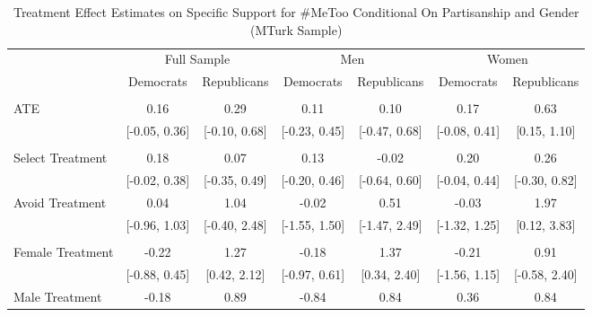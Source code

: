 \documentclass[
]{article}
\begin{document}
\begin{table}[H]

\caption{\label{tab:tabF3}Treatment Effect Estimates on Specific Support for \#MeToo Conditional On Partisanship and Gender (MTurk Sample)}
\centering
\begin{threeparttable}
\begin{tabular}[t]{lcccccc}
\toprule
\multicolumn{1}{c}{ } & \multicolumn{2}{c}{Full Sample} & \multicolumn{2}{c}{Men} & \multicolumn{2}{c}{Women} \\
\cmidrule(l{3pt}r{3pt}){2-3} \cmidrule(l{3pt}r{3pt}){4-5} \cmidrule(l{3pt}r{3pt}){6-7}
  & Democrats & Republicans & Democrats & Republicans & Democrats & Republicans\\
\midrule
\addlinespace[0.3em]
\multicolumn{7}{l}{\textbf{ATE}}\\
\hspace{1em}ATE & 0.16 & 0.29 & 0.11 & 0.10 & 0.17 & 0.63\\
\hspace{1em} & {}[-0.05, 0.36] & {}[-0.10, 0.68] & {}[-0.23, 0.45] & {}[-0.47, 0.68] & {}[-0.08, 0.41] & {}[0.15, 1.10]\\
\addlinespace[0.3em]
\multicolumn{7}{l}{\textbf{ACTE}}\\
\hspace{1em}Select Treatment & 0.18 & 0.07 & 0.13 & -0.02 & 0.20 & 0.26\\
\hspace{1em} & {}[-0.02, 0.38] & {}[-0.35, 0.49] & {}[-0.20, 0.46] & {}[-0.64, 0.60] & {}[-0.04, 0.44] & {}[-0.30, 0.82]\\
\hspace{1em}Avoid Treatment & 0.04 & 1.04 & -0.02 & 0.51 & -0.03 & 1.97\\
\hspace{1em} & {}[-0.96, 1.03] & {}[-0.40, 2.48] & {}[-1.55, 1.50] & {}[-1.47, 2.49] & {}[-1.32, 1.25] & {}[0.12, 3.83]\\
\addlinespace[0.3em]
\multicolumn{7}{l}{\textbf{CACTE}}\\
\hspace{1em}Female Treatment & -0.22 & 1.27 & -0.18 & 1.37 & -0.21 & 0.91\\
\hspace{1em} & {}[-0.88, 0.45] & {}[0.42, 2.12] & {}[-0.97, 0.61] & {}[0.34, 2.40] & {}[-1.56, 1.15] & {}[-0.58, 2.40]\\
\hspace{1em}Male Treatment & -0.18 & 0.89 & -0.84 & 0.84 & 0.36 & 0.84\\

\end{tabular}
\end{threeparttable}
\end{table}
\end{document}
